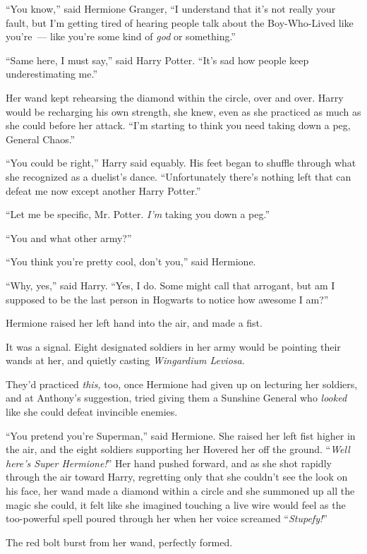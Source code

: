 ``You know,'' said Hermione Granger, ``I understand that it's not really your fault, but I'm getting tired of hearing people talk about the Boy-Who-Lived like you're~--- like you're some kind of \emph{god} or something.''

``Same here, I must say,'' said Harry Potter. ``It's sad how people keep underestimating me.''

Her wand kept rehearsing the diamond within the circle, over and over. Harry would be recharging his own strength, she knew, even as she practiced as much as she could before her attack. ``I'm starting to think you need taking down a peg, General Chaos.''

``You could be right,'' Harry said equably. His feet began to shuffle through what she recognized as a duelist's dance. ``Unfortunately there's nothing left that can defeat me now except another Harry Potter.''

``Let me be specific, Mr. Potter. \emph{I'm} taking you down a peg.''

``You and what other army?''

``You think you're pretty cool, don't you,'' said Hermione.

``Why, yes,'' said Harry. ``Yes, I do. Some might call that arrogant, but am I supposed to be the last person in Hogwarts to notice how awesome I am?''

Hermione raised her left hand into the air, and made a fist.

It was a signal. Eight designated soldiers in her army would be pointing their wands at her, and quietly casting \emph{Wingardium Leviosa}.

They'd practiced \emph{this,} too, once Hermione had given up on lecturing her soldiers, and at Anthony's suggestion, tried giving them a Sunshine General who \emph{looked} like she could defeat invincible enemies.

``You pretend you're Superman,'' said Hermione. She raised her left fist higher in the air, and the eight soldiers supporting her Hovered her off the ground. ``\emph{Well here's Super Hermione!}'' Her hand pushed forward, and as she shot rapidly through the air toward Harry, regretting only that she couldn't see the look on his face, her wand made a diamond within a circle and she summoned up all the magic she could, it felt like she imagined touching a live wire would feel as the too-powerful spell poured through her when her voice screamed ``\emph{Stupefy!}''

The red bolt burst from her wand, perfectly formed.

